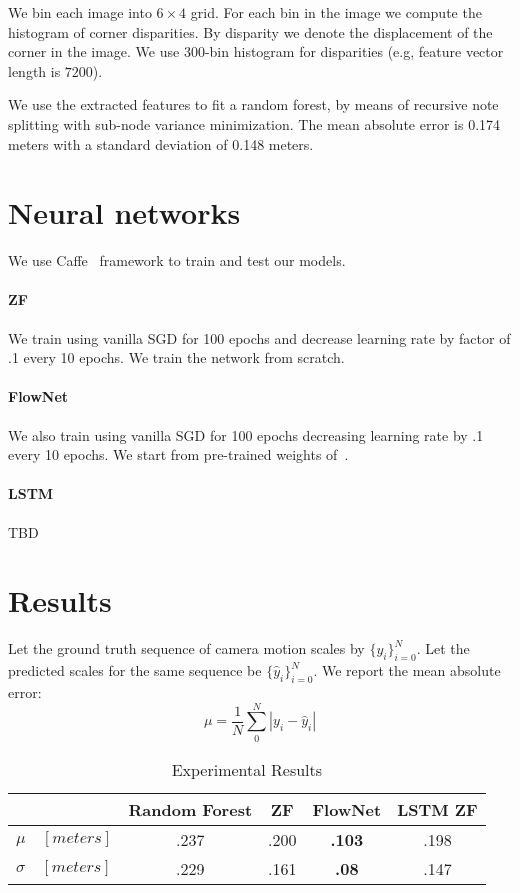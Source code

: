 We bin each image into $6\times 4$ grid.  For each bin in the image we
compute the histogram of corner disparities.  By disparity we denote
the displacement of the corner in the image.  We use $300$-bin
histogram for disparities (e.g, feature vector length is $7200$).

We use the extracted features to fit a random forest, by means of
recursive note splitting with sub-node variance minimization. The mean
absolute error is 0.174 meters with a standard deviation of 0.148
meters.

\section{Neural networks}

We use Caffe~\cite{jia2014caffe} framework to train and test our
models.
\paragraph{ZF} We train using vanilla SGD for 100 epochs and decrease
learning rate by factor of .1 every 10 epochs. We train the network
from scratch.
\paragraph{FlowNet} We also train using vanilla SGD for 100 epochs
decreasing learning rate by .1 every 10 epochs.  We start from
pre-trained weights of~\cite{fischer2015flownet}.
\paragraph{LSTM} TBD

\section{Results}

Let the ground truth sequence of camera motion scales by
$\{y_i\}_{i=0}^N$.  Let the predicted scales for the same sequence be
$\{\hat{y}_i\}_{i=0}^N$.  We report the mean absolute error:
\[
  \mu = \frac{1}{N}\sum_0^N{|y_i - \hat{y}_i|}
\]

\begin{table}[ht]
  \centering
  \begin{tabular}{ lcccc }
    \hline
                        & Random Forest & ZF   & FlowNet & LSTM ZF \\
    \hline
    $\mu\quad[meters]$        & .237          & .200 & \textbf{.103}    & .198 \\
    $\sigma\quad[meters]$     & .229          & .161 & \textbf{.08}     & .147 \\    
    \hline
  \end{tabular}
  \caption{Experimental Results}
  \label{table:1}
\end{table}

